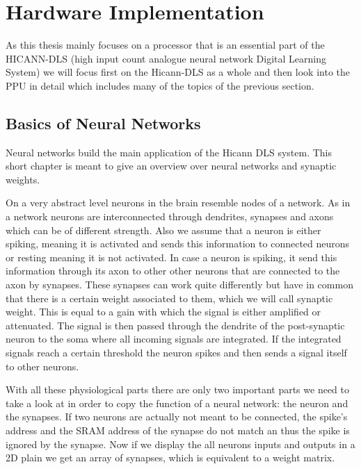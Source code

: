 \section{Hardware Implementation}
As this thesis mainly focuses on a processor that is an essential part of the HICANN-DLS (high input count analogue neural network Digital Learning System) we will focus first on the Hicann-DLS as a whole and then look into the PPU in detail which includes many of the topics of the previous section.

\subsection{Basics of Neural Networks}
Neural networks build the main application of the Hicann DLS system. This short chapter is meant to give an overview over neural networks and synaptic weights.

On a very abstract level neurons in the brain resemble nodes of a network.
As in a network neurons are interconnected through dendrites, synapses and axons which can be of different strength. 
Also we assume that a neuron is either spiking, meaning it is activated and sends this information to connected neurons or resting meaning it is not activated.
In case a neuron is spiking, it send this information through its axon to other other neurons that are connected to the axon by synapses.
These synapses can work quite differently but have in common that there is a certain weight associated to them, which we will call synaptic weight.
This is equal to a gain with which the signal is either amplified or attenuated.
The signal is then passed through the dendrite of the post-synaptic neuron to the soma where all incoming signals are integrated.
If the integrated signals reach a certain threshold the neuron spikes and then sends a signal itself to other neurons.

With all these physiological parts there are only two important parts we need to take a look at in order to copy the function of a neural network: the neuron and the synapses.
If two neurons are actually not meant to be connected, the spike's address and the SRAM address of the synapse do not match an thus the spike is ignored by the synapse.
Now if we display the all neurons inputs and outputs in a 2D plain we get an array of synapses, which is equivalent to a weight matrix.

